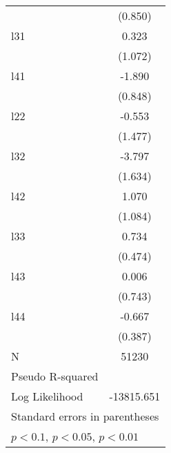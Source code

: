 {\begin{tabular}{l*{1}{c}}
            &     (0.850)         \\
l31         &       0.323         \\
            &     (1.072)         \\
l41         &      -1.890\sym{**} \\
            &     (0.848)         \\
l22         &      -0.553         \\
            &     (1.477)         \\
l32         &      -3.797\sym{**} \\
            &     (1.634)         \\
l42         &       1.070         \\
            &     (1.084)         \\
l33         &       0.734         \\
            &     (0.474)         \\
l43         &       0.006         \\
            &     (0.743)         \\
l44         &      -0.667\sym{*}  \\
            &     (0.387)         \\
\hline
N           &       51230         \\
Pseudo R-squared&                     \\
Log Likelihood&  -13815.651         \\
\hline\hline
\multicolumn{2}{l}{\footnotesize Standard errors in parentheses}\\
\multicolumn{2}{l}{\footnotesize \sym{*} \(p<0.1\), \sym{**} \(p<0.05\), \sym{***} \(p<0.01\)}\\
\end{tabular}
}
